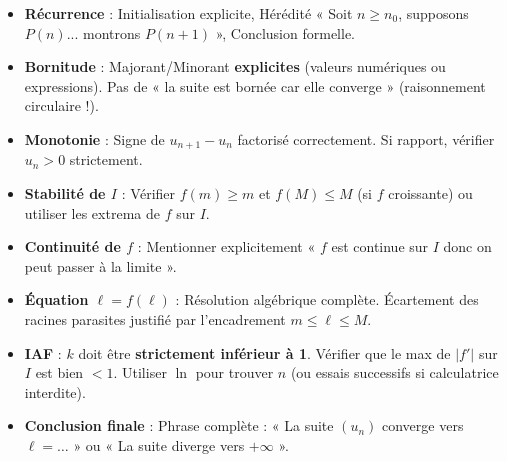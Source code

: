 \documentclass[11pt]{article}
\begin{document}
\begin{attention}
\begin{itemize}
  \item[$\square$] \textbf{Récurrence} : Initialisation explicite, Hérédité « Soit $n\ge n_0$, supposons $P(n)$... montrons $P(n+1)$ », Conclusion formelle.
  \item[$\square$] \textbf{Bornitude} : Majorant/Minorant \textbf{explicites} (valeurs numériques ou expressions). Pas de « la suite est bornée car elle converge » (raisonnement circulaire !).
  \item[$\square$] \textbf{Monotonie} : Signe de $u_{n+1}-u_n$ factorisé correctement. Si rapport, vérifier $u_n>0$ strictement.
  \item[$\square$] \textbf{Stabilité de $I$} : Vérifier $f(m)\ge m$ et $f(M)\le M$ (si $f$ croissante) ou utiliser les extrema de $f$ sur $I$.
  \item[$\square$] \textbf{Continuité de $f$} : Mentionner explicitement « $f$ est continue sur $I$ donc on peut passer à la limite ».
  \item[$\square$] \textbf{Équation $\ell=f(\ell)$} : Résolution algébrique complète. Écartement des racines parasites justifié par l'encadrement $m\le \ell\le M$.
  \item[$\square$] \textbf{IAF} : $k$ doit être \textbf{strictement inférieur à 1}. Vérifier que le max de $|f'|$ sur $I$ est bien $<1$. Utiliser $\ln$ pour trouver $n$ (ou essais successifs si calculatrice interdite).
  \item[$\square$] \textbf{Conclusion finale} : Phrase complète : « La suite $(u_n)$ converge vers $\ell = \dots$ » ou « La suite diverge vers $+\infty$ ».
\end{itemize}
\end{attention}
\end{document}
